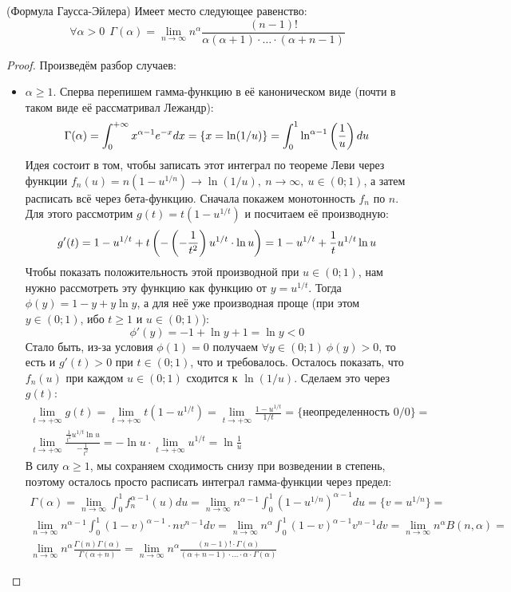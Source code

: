 \begin{theorem} (Формула Гаусса-Эйлера)
	Имеет место следующее равенство:
	\[
		\forall \alpha > 0\ \ \Gamma(\alpha) = \lim_{n \to \infty} n^\alpha \frac{(n - 1)!}{\alpha(\alpha + 1) \cdot \ldots \cdot (\alpha + n - 1)}
	\]
\end{theorem}

\begin{proof}
	Произведём разбор случаев:
	\begin{itemize}
		\item $\alpha \ge 1$. Сперва перепишем гамма-функцию в её каноническом виде (почти в таком виде её рассматривал Лежандр):
		\[
			\Gamma(\alpha) = \int_0^{+\infty} x^{\alpha - 1}e^{-x}dx = \{x = \ln(1 / u)\} = \int_0^1 \ln^{\alpha - 1} \left(\frac{1}{u}\right)du
		\]
		Идея состоит в том, чтобы записать этот интеграл по теореме Леви через функции $f_n(u) = n(1 - u^{1 / n}) \to \ln(1 / u),\ n \to \infty,\ u \in (0; 1)$, а затем расписать всё через бета-функцию. Сначала покажем монотонность $f_n$ по $n$. Для этого рассмотрим $g(t) = t(1 - u^{1 / t})$ и посчитаем её производную:
		\[
			g'(t) = 1 - u^{1 / t} + t\left(-\left(-\frac{1}{t^2}\right)u^{1 / t} \cdot \ln u\right) = 1 - u^{1 / t} + \frac{1}{t}u^{1 / t}\ln u
		\]
		Чтобы показать положительность этой производной при $u \in (0; 1)$, нам нужно рассмотреть эту функцию как функцию от $y = u^{1 / t}$. Тогда $\phi(y) = 1 - y + y\ln y$, а для неё уже производная проще (при этом $y \in (0; 1)$, ибо $t \ge 1$ и $u \in (0; 1)$):
		\[
			\phi'(y) = -1 + \ln y + 1 = \ln y < 0
		\]
		Стало быть, из-за условия $\phi(1) = 0$ получаем $\forall y \in (0; 1)\ \phi(y) > 0$, то есть и $g'(t) > 0$ при $t \in (0; 1)$, что и требовалось. Осталось показать, что $f_n(u)$ при каждом $u \in (0; 1)$ сходится к $\ln(1 / u)$. Сделаем это через $g(t)$:
		\begin{multline*}
			\lim_{t \to +\infty} g(t) = \lim_{t \to +\infty} t(1 - u^{1 / t}) = \lim_{t \to +\infty} \frac{1 - u^{1 / t}}{1 / t} = \{\text{неопределенность } 0 / 0\} =
			\\
			\lim_{t \to +\infty} \frac{\frac{1}{t^2}u^{1 / t}\ln u}{-\frac{1}{t^2}} = -\ln u \cdot \lim_{t \to +\infty} u^{1 / t} = \ln \frac{1}{u}
		\end{multline*}
		В силу $\alpha \ge 1$, мы сохраняем сходимость снизу при возведении в степень, поэтому осталось просто расписать интеграл гамма-функции через предел:
		\begin{multline*}
			\Gamma(\alpha) = \lim_{n \to \infty} \int_0^1 f_n^{\alpha - 1}(u)du = \lim_{n \to \infty} n^{\alpha - 1} \int_0^1 (1 - u^{1 / n})^{\alpha - 1}du = \{v = u^{1 / n}\} =
			\\
			\lim_{n \to \infty} n^{\alpha - 1} \int_0^1 (1 - v)^{\alpha - 1} \cdot nv^{n - 1}dv = \lim_{n \to \infty} n^\alpha \int_0^1 (1 - v)^{\alpha - 1}v^{n - 1}dv = \lim_{n \to \infty} n^\alpha B(n, \alpha) =
			\\
			\lim_{n \to \infty} n^\alpha \frac{\Gamma(n)\Gamma(\alpha)}{\Gamma(\alpha + n)} = \lim_{n \to \infty} n^\alpha\frac{(n - 1)! \cdot \Gamma(\alpha)}{(\alpha + n - 1) \cdot \ldots \cdot \alpha \cdot \Gamma(\alpha)}
		\end{multline*}
		

\end{itemize}
\end{proof}

